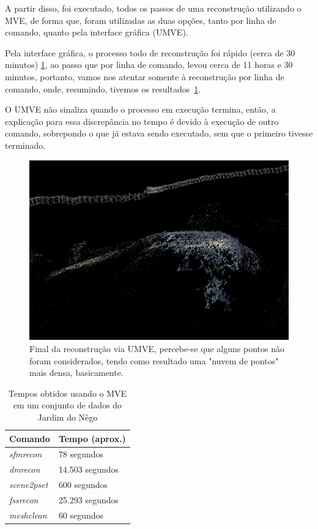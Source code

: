A partir disso, foi executado, todos os passos de uma reconstrução utilizando o MVE, de forma que, foram utilizadas as duas opções, tanto por linha de comando, quanto pela interface gráfica (UMVE).

Pela interface gráfica, o processo todo de reconstrução foi rápido (cerca de 30 minutos) \ref{fig:UMVEdense}, ao passo que por linha de comando, levou cerca de 11 horas e 30 minutos, portanto, vamos nos atentar somente à reconstrução por linha de comando, onde, resumindo, tivemos os resultados~\ref{tab:mveSapo}. 

O UMVE não sinaliza quando o processo em execução termina, então, a explicação para essa discrepância no tempo é devido à execução de outro comando, sobrepondo o que já estava sendo executado, sem que o primeiro tivesse terminado.

\begin{figure}[!h]
	\centering
	\includegraphics[width=0.5\linewidth]{figs/umvedense.png}
	\caption{%
	Final da reconstrução via UMVE, percebe-se que alguns pontos não foram considerados, tendo como resultado uma "nuvem de pontos" mais densa, basicamente.
	}\label{fig:UMVEdense}
\end{figure} 

\begin{table}[!h]
\centering
\caption{Tempos obtidos usando o MVE em um conjunto de dados do Jardim do Nêgo}
\label{tab:mveSapo}
\begin{tabular}{|l|l|}
\hline
Comando            & Tempo (aprox.)    \\ \hline
\emph{sfmrecon}  & 78 segundos     \\ \hline
\emph{dmrecon}   & 14.503 segundos \\ \hline
\emph{scene2pset} & 600 segundos    \\ \hline
\emph{fssrecon}  & 25.293 segundos \\ \hline
\emph{meshclean} & 60 segundos     \\ \hline
\end{tabular}
\end{table}

